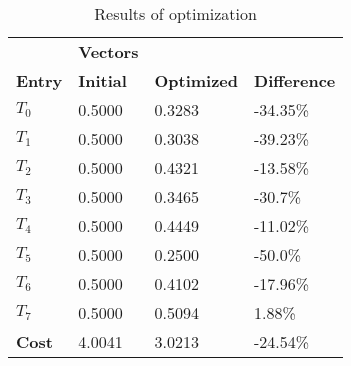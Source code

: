 \begin{table}[h!]
\centering
\begin{tabular}{llll}
\textbf{}      & \cellcolor[HTML]{EFEFEF}\textbf{Vectors} & \textbf{} & \textbf{}         \\
\rowcolor[HTML]{EFEFEF} 
\textbf{Entry} & \textbf{Initial} & \textbf{Optimized} & \textbf{Difference} \\
$T_0$ & 0.5000 & 0.3283 & -34.35\% \\ 
$T_1$ & 0.5000 & 0.3038 & -39.23\% \\ 
$T_2$ & 0.5000 & 0.4321 & -13.58\% \\ 
$T_3$ & 0.5000 & 0.3465 & -30.7\% \\ 
$T_4$ & 0.5000 & 0.4449 & -11.02\% \\ 
$T_5$ & 0.5000 & 0.2500 & -50.0\% \\ 
$T_6$ & 0.5000 & 0.4102 & -17.96\% \\ 
$T_7$ & 0.5000 & 0.5094 & 1.88\% \\ 
\rowcolor[HTML]{EFEFEF} 
\textbf{Cost}  & 4.0041 & 3.0213 & -24.54\% \\ 
\end{tabular}
\caption{Results of optimization}
\label{tab:OptimizationAnalysis}
\end{table}